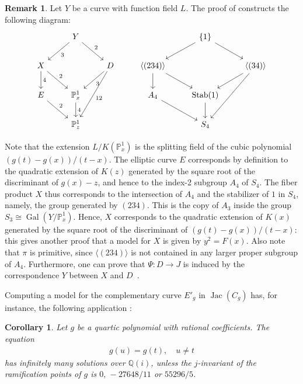 \documentclass[a4paper,twoside,english]{amsart}
\theoremstyle{plain}
\newtheorem{corollary}[theorem]{Corollary}
\theoremstyle{definition}
\newtheorem{remark}[theorem]{Remark}
\begin{document}
\begin{remark}
    Let $Y$ be a curve with function field $L$. The proof of  constructs the following diagram:
    \[
\begin{tikzcd}
                                 & Y \arrow[ld, "3"] \arrow[rd, "2"] &               &                                           & \{1\} \arrow[ld] \arrow[rd]          &                                             \\
X \arrow[rd, "2"] \arrow[d, "4"] &                                            & D \arrow[ld, "3"] \arrow[ldd, "12"] & \langle(234) \rangle \arrow[rd] \arrow[d] &                                  & \langle (34) \rangle \arrow[ld] \arrow[ldd] \\
E \arrow[rd, "2"]                & \mathbb P^1_x \arrow[d, "4"]                 &               & A_4 \arrow[rd]                              & \operatorname{Stab}(1) \arrow[d] &                                             \\
                                 & \mathbb P^1_z                                &               &                                           & S_4                              &                                            
\end{tikzcd} \]

    Note that the extension $L / K(\mathbb{P}^1_x)$ is the splitting field of the cubic polynomial $(g(t)-g(x))/(t-x)$. The elliptic curve $E$ corresponds by definition to the quadratic extension of $K(z)$ generated by the square root of the discriminant of $g(x)-z$, and hence to the index-2 subgroup $A_4$ of $S_4$.
    The fiber product $X$ thus corresponds to the intersection of $A_4$ and the stabilizer of $1$ in $S_4$, namely, the group generated by $(234)$. 
    This is the copy of $A_3$ inside the group $S_3 \cong \operatorname{Gal}(Y/\mathbb{P}^1_x)$.
    Hence, $X$ corresponds to the quadratic extension of $K(x)$ generated by the square root of the discriminant of $(g(t)-g(x))/(t-x)$: this gives another proof that a model for $X$ is given by $y^2=F(x)$. Also note that $\pi$ is primitive, since $\langle(234)\rangle$ is not contained in any larger proper subgroup of $A_4$.
    Furthermore, one can prove that $\Psi\colon D \to J$ is induced by the correspondence $Y$ between $X$ and $D$~\cite[\S 2]{gallese}.
\end{remark}

Computing a model for the complementary curve $E'_g$ in $\operatorname{Jac}(C_g)$ has, for instance, the following application \cite[Theorem 2]{nac2}:
\begin{corollary}\label{cor: fp}
    Let $g$ be a quartic polynomial with rational coefficients. The equation
    \begin{align*}
        g(u)=g(t), \quad u\neq t
    \end{align*}
    has infinitely many solutions over $\mathbb Q(i)$, unless the $j$-invariant of the ramification points of $g$ is $0,\, -27648/11$ or $55296/5$.
\end{corollary}
\end{document}
